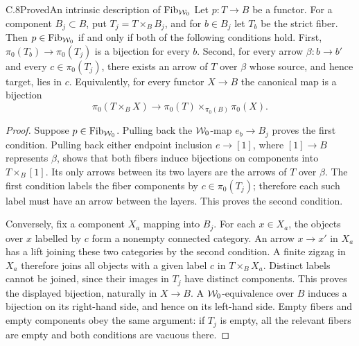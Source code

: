 \begin{claim}{C.8}{Proved}{An intrinsic description of $\operatorname{Fib}_{\mathcal{W}_0}$}
Let $p:T\to B$ be a functor. For a component $B_j\subset B$, put
$T_j=T\times_BB_j$, and for $b\in B_j$ let $T_b$ be the strict fiber.
Then $p\in\operatorname{Fib}_{\mathcal{W}_0}$ if and only if both of the following conditions
hold. First, $\pi_0(T_b)\to\pi_0(T_j)$ is a bijection for every $b$.
Second, for every arrow $\beta:b\to b'$ and every
$c\in\pi_0(T_j)$, there exists an arrow of $T$ over $\beta$ whose
source, and hence target, lies in $c$.
Equivalently, for every functor $X\to B$ the canonical map is a bijection
\[
 \pi_0(T\times_BX)\longrightarrow
 \pi_0(T)\times_{\pi_0(B)}\pi_0(X).
\]
\end{claim}
\begin{proof}
Suppose $p\in\operatorname{Fib}_{\mathcal{W}_0}$. Pulling back the $\mathcal{W}_0$-map
$e_b\to B_j$ proves the first condition. Pulling back either
endpoint inclusion $e\to[1]$, where $[1]\to B$ represents $\beta$,
shows that both fibers induce bijections on components into
$T\times_B[1]$. Its only arrows between its two layers are the
arrows of $T$ over $\beta$. The first condition labels the fiber
components by $c\in\pi_0(T_j)$; therefore each such label must have
an arrow between the layers. This proves the second condition.

Conversely, fix a component $X_a$ mapping into $B_j$. For each
$x\in X_a$, the objects over $x$ labelled by $c$ form a nonempty
connected category. An arrow $x\to x'$ in $X_a$ has a lift joining
these two categories by the second condition. A finite zigzag in
$X_a$ therefore joins all objects with a given label $c$ in
$T\times_BX_a$. Distinct labels cannot be joined, since their
images in $T_j$ have distinct components. This proves the displayed
bijection, naturally in $X\to B$. A $\mathcal{W}_0$-equivalence over $B$
induces a bijection on its right-hand side, and hence on its
left-hand side. Empty fibers and empty components obey the same
argument: if $T_j$ is empty, all the relevant fibers are empty and
both conditions are vacuous there.
\end{proof}

